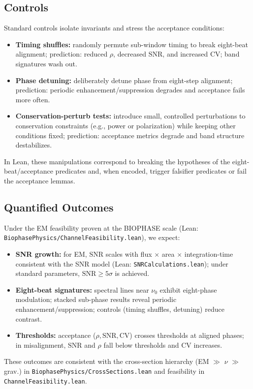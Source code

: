 \documentclass[12pt,a4paper]{article}
\begin{document}
\subsection{Controls}
Standard controls isolate invariants and stress the acceptance conditions:
\begin{itemize}
  \item \textbf{Timing shuffles:} randomly permute sub-window timing to break eight-beat alignment; prediction: reduced \(\rho\), decreased \(\mathrm{SNR}\), and increased \(\mathrm{CV}\); band signatures wash out.
  \item \textbf{Phase detuning:} deliberately detune phase from eight-step alignment; prediction: periodic enhancement/suppression degrades and acceptance fails more often.
  \item \textbf{Conservation-perturb tests:} introduce small, controlled perturbations to conservation constraints (e.g., power or polarization) while keeping other conditions fixed; prediction: acceptance metrics degrade and band structure destabilizes.
\end{itemize}
In Lean, these manipulations correspond to breaking the hypotheses of the eight-beat/acceptance predicates and, when encoded, trigger falsifier predicates or fail the acceptance lemmas.

\subsection{Quantified Outcomes}
Under the EM feasibility proven at the BIOPHASE scale (Lean: \texttt{BiophasePhysics/ChannelFeasibility.lean}), we expect:
\begin{itemize}
  \item \textbf{SNR growth:} for EM, \(\mathrm{SNR}\) scales with flux \(\times\) area \(\times\) integration-time consistent with the SNR model (Lean: \texttt{SNRCalculations.lean}); under standard parameters, \(\mathrm{SNR}\ge 5\sigma\) is achieved.
  \item \textbf{Eight-beat signatures:} spectral lines near \(\nu_{0}\) exhibit eight-phase modulation; stacked sub-phase results reveal periodic enhancement/suppression; controls (timing shuffles, detuning) reduce contrast.
  \item \textbf{Thresholds:} acceptance (\(\rho,\mathrm{SNR},\mathrm{CV}\)) crosses thresholds at aligned phases; in misalignment, \(\mathrm{SNR}\) and \(\rho\) fall below thresholds and \(\mathrm{CV}\) increases.
\end{itemize}
These outcomes are consistent with the cross-section hierarchy (EM \(\gg\) \(\nu\) \(\gg\) grav.) in \texttt{BiophasePhysics/CrossSections.lean} and feasibility in \texttt{ChannelFeasibility.lean}.
\end{document}
